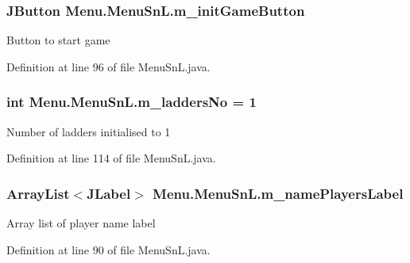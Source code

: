 \subsubsection[{m\+\_\+init\+Game\+Button}]{\setlength{\rightskip}{0pt plus 5cm}J\+Button Menu.\+Menu\+Sn\+L.\+m\+\_\+init\+Game\+Button\hspace{0.3cm}{\ttfamily [private]}}\label{class_menu_1_1_menu_sn_l_ac45af15bf2aabd1916063700e1e44f08}
Button to start game 

Definition at line 96 of file Menu\+Sn\+L.\+java.

\hypertarget{class_menu_1_1_menu_sn_l_a30c87e65118ddf61c75fa3d9d9abe36e}{}
\subsubsection[{m\+\_\+ladders\+No}]{\setlength{\rightskip}{0pt plus 5cm}int Menu.\+Menu\+Sn\+L.\+m\+\_\+ladders\+No = 1\hspace{0.3cm}{\ttfamily [private]}}\label{class_menu_1_1_menu_sn_l_a30c87e65118ddf61c75fa3d9d9abe36e}
Number of ladders initialised to 1 

Definition at line 114 of file Menu\+Sn\+L.\+java.

\hypertarget{class_menu_1_1_menu_sn_l_ab29efffc6315a328efb34fed209c0677}{}
\subsubsection[{m\+\_\+name\+Players\+Label}]{\setlength{\rightskip}{0pt plus 5cm}Array\+List$<$J\+Label$>$ Menu.\+Menu\+Sn\+L.\+m\+\_\+name\+Players\+Label\hspace{0.3cm}{\ttfamily [private]}}\label{class_menu_1_1_menu_sn_l_ab29efffc6315a328efb34fed209c0677}
Array list of player name label 

Definition at line 90 of file Menu\+Sn\+L.\+java.

\hypertarget{class_menu_1_1_menu_sn_l_afee3307aa062adfbee4edd14484c8f2c}{}
